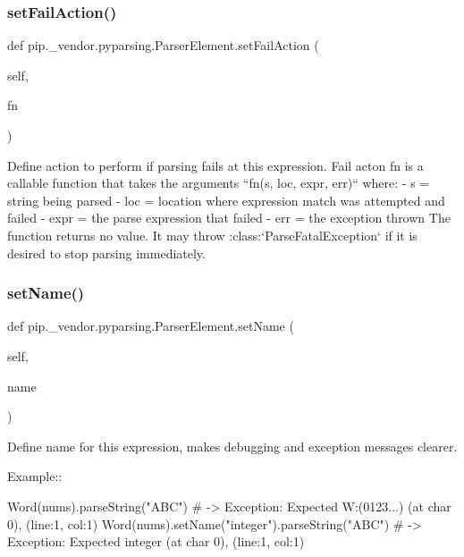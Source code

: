 \subsubsection{\texorpdfstring{set\+Fail\+Action()}{setFailAction()}}
{\footnotesize\ttfamily def pip.\+\_\+vendor.\+pyparsing.\+Parser\+Element.\+set\+Fail\+Action (\begin{DoxyParamCaption}\item[{}]{self,  }\item[{}]{fn }\end{DoxyParamCaption})}

\begin{DoxyVerb}Define action to perform if parsing fails at this expression.
   Fail acton fn is a callable function that takes the arguments
   ``fn(s, loc, expr, err)`` where:
   - s = string being parsed
   - loc = location where expression match was attempted and failed
   - expr = the parse expression that failed
   - err = the exception thrown
   The function returns no value.  It may throw :class:`ParseFatalException`
   if it is desired to stop parsing immediately.\end{DoxyVerb}
 \mbox{\label{classpip_1_1__vendor_1_1pyparsing_1_1ParserElement_a110e6b3f0797a5730f4c0d851314071e}} 
\subsubsection{\texorpdfstring{set\+Name()}{setName()}}
{\footnotesize\ttfamily def pip.\+\_\+vendor.\+pyparsing.\+Parser\+Element.\+set\+Name (\begin{DoxyParamCaption}\item[{}]{self,  }\item[{}]{name }\end{DoxyParamCaption})}

\begin{DoxyVerb}Define name for this expression, makes debugging and exception messages clearer.

Example::

    Word(nums).parseString("ABC")  # -> Exception: Expected W:(0123...) (at char 0), (line:1, col:1)
    Word(nums).setName("integer").parseString("ABC")  # -> Exception: Expected integer (at char 0), (line:1, col:1)
\end{DoxyVerb}
 \mbox{\label{classpip_1_1__vendor_1_1pyparsing_1_1ParserElement_ac3f85e84152181b62852b9c0f70b1fb4}} 
